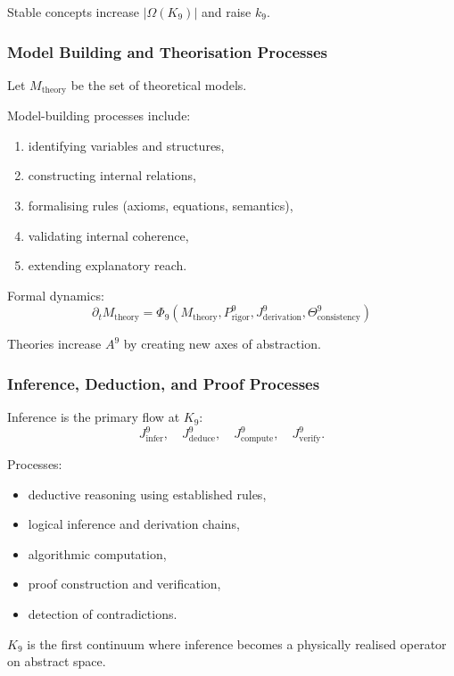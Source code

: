Stable concepts increase $|\Omega(K_9)|$ and raise $k_9$.

\subsubsection{Model Building and Theorisation Processes}

Let $M_{\text{theory}}$ be the set of theoretical models.

Model-building processes include:
\begin{enumerate}
    \item identifying variables and structures,
    \item constructing internal relations,
    \item formalising rules (axioms, equations, semantics),
    \item validating internal coherence,
    \item extending explanatory reach.
\end{enumerate}

Formal dynamics:
\[
\partial_t M_{\text{theory}}
= \Phi_9(M_{\text{theory}}, P^9_{\text{rigor}},
         J^9_{\text{derivation}},
         \Theta^9_{\text{consistency}})
\]

Theories increase $A^9$ by creating new axes of abstraction.

\subsubsection{Inference, Deduction, and Proof Processes}

Inference is the primary flow at $K_9$:
\[
J^9_{\text{infer}}, \quad J^9_{\text{deduce}}, \quad
J^9_{\text{compute}}, \quad J^9_{\text{verify}}.
\]

Processes:
\begin{itemize}
    \item deductive reasoning using established rules,
    \item logical inference and derivation chains,
    \item algorithmic computation,
    \item proof construction and verification,
    \item detection of contradictions.
\end{itemize}

$K_9$ is the first continuum where inference
becomes a physically realised operator on abstract space.

